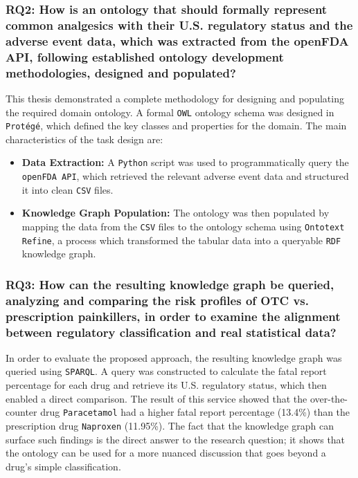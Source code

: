 \subsubsection*{RQ2: How is an ontology that should formally represent common analgesics with their U.S. regulatory status and the adverse event data, which was extracted from the openFDA API, following established ontology development methodologies, designed and populated?}
This thesis demonstrated a complete methodology for designing and populating the required domain ontology. A formal \texttt{OWL} ontology schema was designed in \texttt{Protégé}, which defined the key classes and properties for the domain. The main characteristics of the task design are:
\begin{itemize}
    \item \textbf{Data Extraction:} A \texttt{Python} script was used to programmatically query the \texttt{openFDA API}, which retrieved the relevant adverse event data and structured it into clean \texttt{CSV} files.
    \item \textbf{Knowledge Graph Population:} The ontology was then populated by mapping the data from the \texttt{CSV} files to the ontology schema using \texttt{Ontotext Refine}, a process which transformed the tabular data into a queryable \texttt{RDF} knowledge graph.
\end{itemize}

\subsubsection*{RQ3: How can the resulting knowledge graph be queried, analyzing and comparing the risk profiles of OTC vs. prescription painkillers, in order to examine the alignment between regulatory classification and real statistical data?}
In order to evaluate the proposed approach, the resulting knowledge graph was queried using \texttt{SPARQL}. A query was constructed to calculate the fatal report percentage for each drug and retrieve its U.S. regulatory status, which then enabled a direct comparison. The result of this service showed that the over-the-counter drug \texttt{Paracetamol} had a higher fatal report percentage (13.4\%) than the prescription drug \texttt{Naproxen} (11.95\%). The fact that the knowledge graph can surface such findings is the direct answer to the research question; it shows that the ontology can be used for a more nuanced discussion that goes beyond a drug's simple classification.

